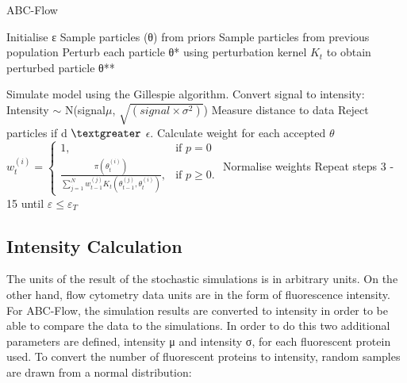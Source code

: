\begin{algorithm}[htbp]

\caption{ABC-Flow}
\label{alg:abc-flow}
 \begin{algorithmic}[1]
 	\Statex
 	
	\State Initialise ε
		\State Sample particles (θ) from priors
		\Else
			\State Sample particles from previous population
			\State Perturb each particle θ* using perturbation kernel $K_t$ to obtain perturbed particle θ** %

	\EndIf
	\State Simulate model using the Gillespie algorithm.
	\State Convert signal to intensity: 
					\State Intensity $\sim$ N\bigg(signal\times$\mu$,  $\sqrt{(signal\times\sigma^2)}$\bigg)
	\EndFor				
	\EndFor	
	\EndFor	
	\EndFor	
	\State Measure distance to data
	\State Reject particles if d $\textgreater$ $\epsilon$.
    \State Calculate weight for each accepted $\theta$
	\State $w_{t}^{(i)} = \begin{cases} 1, & \mbox{if } p = 0 \\\frac{\pi(\theta_{t}^{(i)})}{\sum_{j=1}^N w_{t-1}^{(j)} K_{t}(\theta_{t-1}^{(j)}, \theta_{t}^{(i)})}, & \mbox{if } p \geq  0. \end{cases}$
	\State Normalise weights
	\State Repeat steps 3 - 15 until $ε \leq ε_T$	%
  \end{algorithmic}
\end{algorithm}
\clearpage
\subsection{Intensity Calculation}

The units of the result of the stochastic simulations is in arbitrary units. On the other hand, flow cytometry data units are in the form of fluorescence intensity. For ABC-Flow, the simulation results are converted to intensity in order to be able to compare the data to the simulations. In order to do this two additional parameters are defined, intensity μ and intensity σ, for each fluorescent protein used. To convert the number of fluorescent proteins to intensity, random samples are drawn from a normal distribution:

